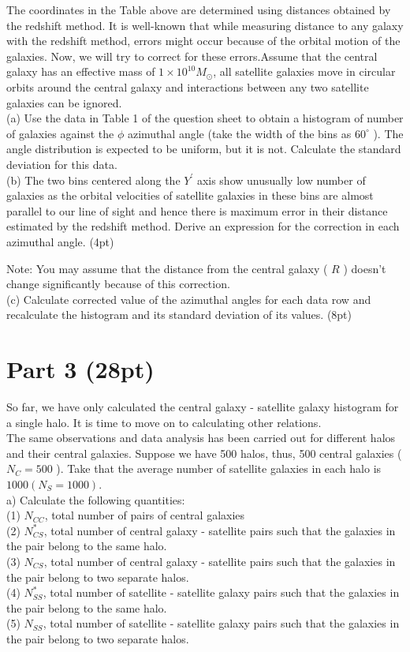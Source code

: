 \documentclass[10pt]{article}
\begin{document}
The coordinates in the Table above are determined using distances obtained by the redshift method. It is well-known that while measuring distance to any galaxy with the redshift method, errors might occur because of the orbital motion of the galaxies. Now, we will try to correct for these errors.Assume that the central galaxy has an effective mass of $1 \times 10^{10} M_{\odot}$, all satellite galaxies move in circular orbits around the central galaxy and interactions between any two satellite galaxies can be ignored.\\
(a) Use the data in Table 1 of the question sheet to obtain a histogram of number of galaxies against the $\phi$ azimuthal angle (take the width of the bins as $60^{\circ}$ ). The angle distribution is expected to be uniform, but it is not. Calculate the standard deviation for this data.\\
(b) The two bins centered along the $Y^{\prime}$ axis show unusually low number of galaxies as the orbital velocities of satellite galaxies in these bins are almost parallel to our line of sight and hence there is maximum error in their distance estimated by the redshift method. Derive an expression for the correction in each azimuthal angle. (4pt)

Note: You may assume that the distance from the central galaxy ( $R$ ) doesn't change significantly because of this correction.\\
(c) Calculate corrected value of the azimuthal angles for each data row and recalculate the histogram and its standard deviation of its values. (8pt)

\section*{Part 3 (28pt)}
So far, we have only calculated the central galaxy - satellite galaxy histogram for a single halo. It is time to move on to calculating other relations.\\
The same observations and data analysis has been carried out for different halos and their central galaxies. Suppose we have 500 halos, thus, 500 central galaxies ( $N_{C}=500$ ). Take that the average number of satellite galaxies in each halo is $1000\left(N_{S}=1000\right)$.\\
a) Calculate the following quantities:\\
(1) $N_{C C}$, total number of pairs of central galaxies\\
(2) $N_{C S}^{*}$, total number of central galaxy - satellite pairs such that the galaxies in the pair belong to the same halo.\\
(3) $N_{C S}$, total number of central galaxy - satellite pairs such that the galaxies in the pair belong to two separate halos.\\
(4) $N_{S S}^{*}$, total number of satellite - satellite galaxy pairs such that the galaxies in the pair belong to the same halo.\\
(5) $N_{S S}$, total number of satellite - satellite galaxy pairs such that the galaxies in the pair belong to two separate halos.
\end{document}
